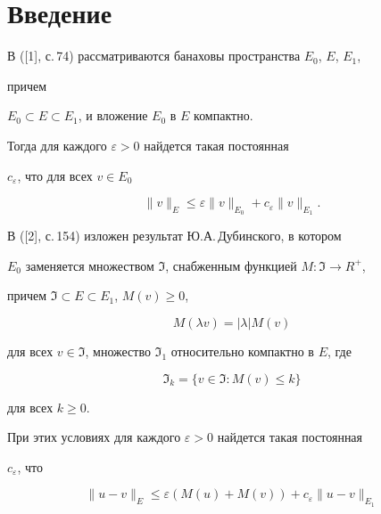 \label{begin} 


 


 


\section*{Введение} 


 


В ([1], с.\,74) рассматриваются банаховы пространства $E_0$, $E$, $E_1$, 


причем  


$E_0\subset E\subset E_1$, и вложение $E_0$ в $E$ компактно. 


Тогда для каждого $\varepsilon>0$ найдется такая постоянная 


$c_\varepsilon$, что для всех $v\in E_0$ 


\begin{equation} 


\|v\|_E\le\varepsilon\|v\|_{E_0}+ 


c_\varepsilon\|v\|_{E_1}. 


\end{equation} 


В ([2], с.\,154) изложен результат Ю.А.\,Дубинского, в котором 


$E_0$ заменяется множеством $\Im$, снабженным функцией $M:\Im\to R^+$, 


причем $\Im\subset E\subset E_1$, $M(v)\ge0$, 


\begin{equation} 


M(\lambda v)=|\lambda|M(v) 


\end{equation} 


для всех $v\in\Im$, множество $\Im_1$ относительно компактно в $E$, где 


\begin{equation} 


\Im_k=\{v\in\Im:M(v)\le k\} 


\end{equation} 


для всех $k\ge0$. 


При этих условиях для каждого $\varepsilon>0$ найдется такая постоянная 


$c_\varepsilon$, что 


\begin{equation} 


\|u-v\|_E\le\varepsilon(M(u)+M(v))+ 


c_\varepsilon\|u-v\|_{E_1} 


\end{equation} 


